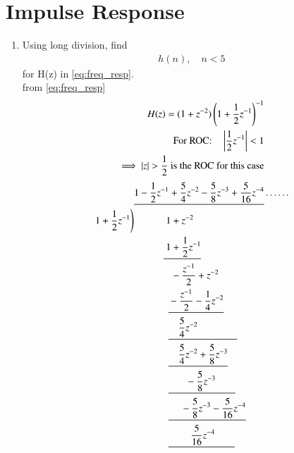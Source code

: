 \documentclass[journal,12pt,twocolumn]{IEEEtran}
\renewcommand\thesection{\arabic{section}}
\begin{document}
		\section{Impulse Response}
		\begin{enumerate}[label=\thesection.\arabic*]
			\item Using long division, 
			find
			\begin{align}
				h(n), \quad n < 5
			\end{align}
			for H(z) in 
			\eqref{eq:freq_resp}.\\
			\solution
			from \eqref{eq:freq_resp}
			\begin{align}
				H(z) %
				= (1 + z^{-2})\brak{1+\frac{1}{2}z^{-1}}^{-1}\\
				\text{For ROC:} \quad \abs{\frac{1}{2}z^{-1}} < 1\\
				\implies \abs{z} > \frac{1}{2} \text{ is the ROC for this case}
			\end{align}
			\tiny
			\begin{align*}
				&\underline{1-\dfrac{1}{2}z^{-1}+\dfrac{5}{4}z^{-2}-\dfrac{5}{8}z^{-3}+\frac{5}{16}z^{-4}}\ldots \ldots\\
				\rbrak{1 + \dfrac{1}{2}z^{-1}} &\text{\quad}\text{\quad}\text{\quad}\text{   }\text{$1 + z^{-2}$}\\
				&\text{\quad}\text{\quad}\text{\quad}\underline{\text{ }1 + \frac{1}{2}z^{-1}}\\
				&\text{\quad}\text{\quad}\text{\quad}\text{ }\text{ }\text{ }-\frac{z^{-1}}{2}+z^{-2}\\
				&\text{\quad}\text{\quad}\text{\quad}\text{ }\text{ }\underline{\text{} -\frac{z^{-1}}{2} - \frac{1}{4}z^{-2}}\\
				&\text{\quad}\text{\quad}\text{\quad}\text{ }\text{ }\underline{\text{ }\text{ }\text{ }\text{ }\frac{5}{4}z^{-2}\text{\quad \quad \quad \quad}}\\
				&\text{\quad}\text{\quad}\text{\quad}\text{ }\text{ }\underline{\text{ }\text{ }\text{ }\text{ }\frac{5}{4}z^{-2} + \frac{5}{8}z^{-3}}\\
				&\text{\quad}\text{\quad}\text{\quad}\text{ }\text{ }\underline{\text{ }\text{ }\text{ }\text{\quad}-\frac{5}{8}z^{-3}\text{\quad}\text{\quad}}\\
				&\text{\quad}\text{\quad}\text{\quad}\text{ }\text{ }\underline{\text{ }\text{ }\text{ }\text{ }\text{ }-\frac{5}{8}z^{-3} - \frac{5}{16}z^{-4}}\\
				&\text{\quad}\text{\quad}\text{\quad}\text{ }\text{ }\underline{\text{ }\text{ }\text{ }\text{ }\text{ }\text{\quad}\frac{5}{16}z^{-4}\text{\quad}\text{\quad}}\\

\end{align*}
\end{enumerate}
\end{document}
